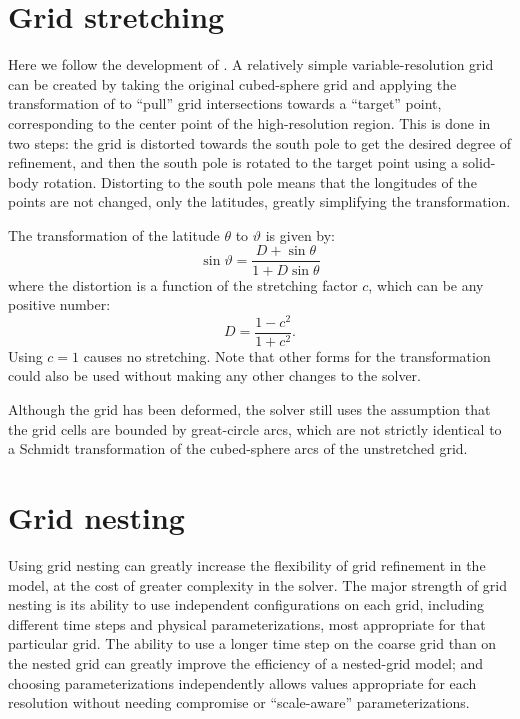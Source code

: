 \documentclass[10pt,letterpaper,margin=1in]{memoir}
\begin{document}
\section{Grid stretching}

Here we follow the development of \citet{HLT16}. A relatively simple variable-resolution grid can be created by taking the original cubed-sphere grid and applying the transformation of \citet{Schmidt1977} to ``pull'' grid intersections towards a ``target'' point, corresponding to the center point of the high-resolution region. This is done in two steps: the grid is distorted towards the south pole to get the desired degree of refinement, and then the south pole is rotated to the target point using a solid-body rotation. Distorting to the south pole means that the longitudes of the points are not changed, only the latitudes, greatly simplifying the transformation.

The transformation of the latitude $\theta$ to $\vartheta$ is given by:
\begin{equation}
\sin \vartheta = \frac{D + \sin \theta}{1 + D\sin \theta}
\end{equation}
where the distortion is a function of the stretching factor $c$, which can be any positive number:
\begin{equation}
D = \frac{1-c^2}{1+c^2}.
\end{equation}
Using $c = 1$ causes no stretching. Note that other forms for the transformation could also be used without making any other changes to the solver.

Although the grid has been deformed, the solver still uses the assumption that the grid cells are bounded by great-circle arcs, which are not strictly identical to a Schmidt transformation of the cubed-sphere arcs of the unstretched grid.

\section{Grid nesting}

Using grid nesting can greatly increase the flexibility of grid refinement in the model, at the cost of greater complexity in the solver. The major strength of grid nesting is its ability to use independent configurations on each grid, including different time steps and physical parameterizations, most appropriate for that particular grid. The ability to use a longer time step on the coarse grid than on the nested grid can greatly improve the efficiency of a nested-grid model; and choosing parameterizations independently allows values appropriate for each resolution without needing compromise or ``scale-aware'' parameterizations.
\end{document}
